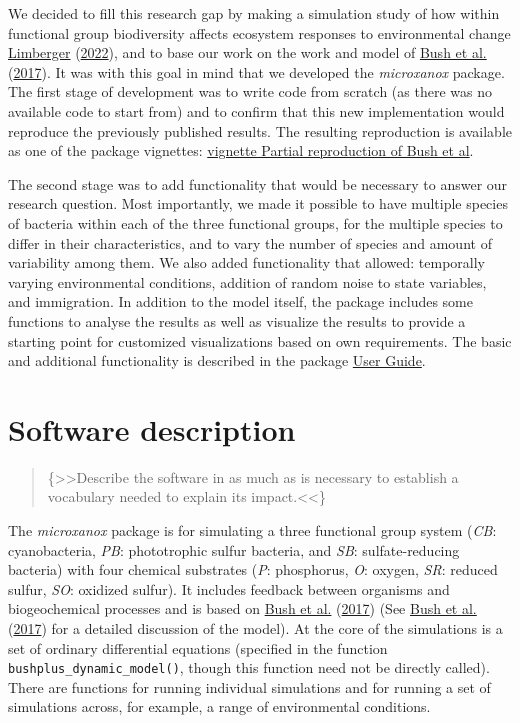 \documentclass[]{elsarticle} %
\begin{document}
We decided to fill this research gap by making a simulation study of how
within functional group biodiversity affects ecosystem responses to
environmental change \protect\hyperlink{ref-Limberger2022}{Limberger}
(\protect\hyperlink{ref-Limberger2022}{2022}), and to base our work on
the work and model of \protect\hyperlink{ref-Bush2017}{Bush et al.}
(\protect\hyperlink{ref-Bush2017}{2017}). It was with this goal in mind
that we developed the \emph{microxanox} package. The first stage of
development was to write code from scratch (as there was no available
code to start from) and to confirm that this new implementation would
reproduce the previously published results. The resulting reproduction
is available as one of the package vignettes:
\href{LINK\%20NEEDED}{vignette Partial reproduction of Bush et al}.

The second stage was to add functionality that would be necessary to
answer our research question. Most importantly, we made it possible to
have multiple species of bacteria within each of the three functional
groups, for the multiple species to differ in their characteristics, and
to vary the number of species and amount of variability among them. We
also added functionality that allowed: temporally varying environmental
conditions, addition of random noise to state variables, and
immigration. In addition to the model itself, the package includes some
functions to analyse the results as well as visualize the results to
provide a starting point for customized visualizations based on own
requirements. The basic and additional functionality is described in the
package \href{LINK_NEEDED}{User Guide}.

\hypertarget{software-description}{%
\section{Software description}\label{software-description}}

\begin{quote}
\{\textgreater\textgreater Describe the software in as much as is
necessary to establish a vocabulary needed to explain its
impact.\textless\textless\}
\end{quote}

The \emph{microxanox} package is for simulating a three functional group
system (\emph{CB}: cyanobacteria, \emph{PB}: phototrophic sulfur
bacteria, and \emph{SB}: sulfate-reducing bacteria) with four chemical
substrates (\emph{P}: phosphorus, \emph{O}: oxygen, \emph{SR}: reduced
sulfur, \emph{SO}: oxidized sulfur). It includes feedback between
organisms and biogeochemical processes and is based on
\protect\hyperlink{ref-Bush2017}{Bush et al.}
(\protect\hyperlink{ref-Bush2017}{2017}) (See
\protect\hyperlink{ref-Bush2017}{Bush et al.}
(\protect\hyperlink{ref-Bush2017}{2017}) for a detailed discussion of
the model). At the core of the simulations is a set of ordinary
differential equations (specified in the function
\texttt{bushplus\_dynamic\_model()}, though this function need not be
directly called). There are functions for running individual simulations
and for running a set of simulations across, for example, a range of
environmental conditions.
\end{document}

